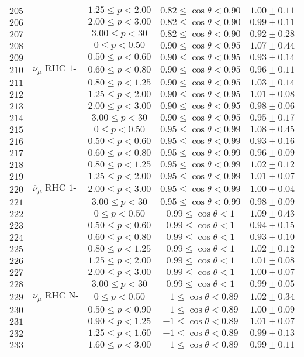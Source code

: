 \begin{longtable}[c]{ccccc}
$205$ &  & $1.25\leq p<2.00$ & $0.82\leq\cos\theta<0.90$ & $1.00\pm0.11$\tabularnewline
$206$ &  & $2.00\leq p<3.00$ & $0.82\leq\cos\theta<0.90$ & $0.99\pm0.11$\tabularnewline
$207$ &  & $3.00\leq p<30$ & $0.82\leq\cos\theta<0.90$ & $0.92\pm0.28$\tabularnewline
$208$ &  & $0\leq p<0.50$ & $0.90\leq\cos\theta<0.95$ & $1.07\pm0.44$\tabularnewline
$209$ &  & $0.50\leq p<0.60$ & $0.90\leq\cos\theta<0.95$ & $0.93\pm0.14$\tabularnewline
$210$ & $\overline{\nu}_{\mu}\text{ RHC 1-Trk Wtr}$ & $0.60\leq p<0.80$ & $0.90\leq\cos\theta<0.95$ & $0.96\pm0.11$\tabularnewline
$211$ &  & $0.80\leq p<1.25$ & $0.90\leq\cos\theta<0.95$ & $1.03\pm0.14$\tabularnewline
$212$ &  & $1.25\leq p<2.00$ & $0.90\leq\cos\theta<0.95$ & $1.01\pm0.08$\tabularnewline
$213$ &  & $2.00\leq p<3.00$ & $0.90\leq\cos\theta<0.95$ & $0.98\pm0.06$\tabularnewline
$214$ &  & $3.00\leq p<30$ & $0.90\leq\cos\theta<0.95$ & $0.95\pm0.17$\tabularnewline
$215$ &  & $0\leq p<0.50$ & $0.95\leq\cos\theta<0.99$ & $1.08\pm0.45$\tabularnewline
$216$ &  & $0.50\leq p<0.60$ & $0.95\leq\cos\theta<0.99$ & $0.93\pm0.16$\tabularnewline
$217$ &  & $0.60\leq p<0.80$ & $0.95\leq\cos\theta<0.99$ & $0.96\pm0.09$\tabularnewline
$218$ &  & $0.80\leq p<1.25$ & $0.95\leq\cos\theta<0.99$ & $1.02\pm0.12$\tabularnewline
$219$ &  & $1.25\leq p<2.00$ & $0.95\leq\cos\theta<0.99$ & $1.01\pm0.07$\tabularnewline
$220$ & $\overline{\nu}_{\mu}\text{ RHC 1-Trk Wtr}$ & $2.00\leq p<3.00$ & $0.95\leq\cos\theta<0.99$ & $1.00\pm0.04$\tabularnewline
$221$ &  & $3.00\leq p<30$ & $0.95\leq\cos\theta<0.99$ & $0.98\pm0.09$\tabularnewline
$222$ &  & $0\leq p<0.50$ & $0.99\leq\cos\theta<1$ & $1.09\pm0.43$\tabularnewline
$223$ &  & $0.50\leq p<0.60$ & $0.99\leq\cos\theta<1$ & $0.94\pm0.15$\tabularnewline
$224$ &  & $0.60\leq p<0.80$ & $0.99\leq\cos\theta<1$ & $0.93\pm0.10$\tabularnewline
$225$ &  & $0.80\leq p<1.25$ & $0.99\leq\cos\theta<1$ & $1.02\pm0.12$\tabularnewline
$226$ &  & $1.25\leq p<2.00$ & $0.99\leq\cos\theta<1$ & $1.01\pm0.08$\tabularnewline
$227$ &  & $2.00\leq p<3.00$ & $0.99\leq\cos\theta<1$ & $1.00\pm0.07$\tabularnewline
$228$ &  & $3.00\leq p<30$ & $0.99\leq\cos\theta<1$ & $0.99\pm0.05$\tabularnewline
$229$ & $\overline{\nu}_{\mu}\text{ RHC N-Trks Wtr}$ & $0\leq p<0.50$ & $-1\leq\cos\theta<0.89$ & $1.02\pm0.34$\tabularnewline
$230$ &  & $0.50\leq p<0.90$ & $-1\leq\cos\theta<0.89$ & $1.00\pm0.09$\tabularnewline
$231$ &  & $0.90\leq p<1.25$ & $-1\leq\cos\theta<0.89$ & $1.01\pm0.07$\tabularnewline
$232$ &  & $1.25\leq p<1.60$ & $-1\leq\cos\theta<0.89$ & $0.99\pm0.13$\tabularnewline
$233$ &  & $1.60\leq p<3.00$ & $-1\leq\cos\theta<0.89$ & $0.99\pm0.11$\tabularnewline

\end{longtable}
